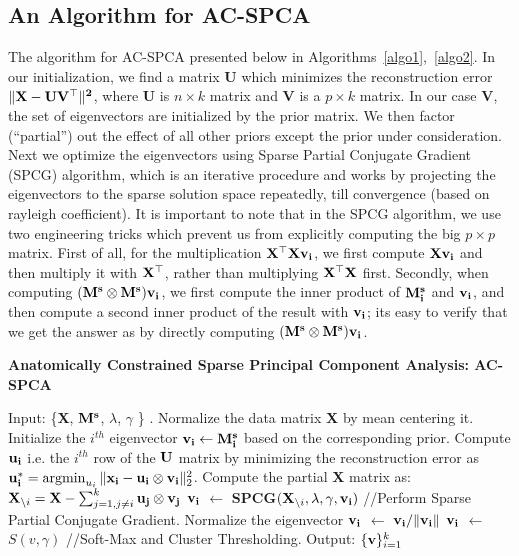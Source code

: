 \documentclass{llncs}
\newcommand{\argmin}{\operatornamewithlimits{argmin}}
\begin{document}

\subsection{An Algorithm for AC-SPCA}
The algorithm for AC-SPCA presented below in Algorithms~\ref{algo1},~\ref{algo2}. In our initialization, we find a matrix {\bf U} which minimizes the reconstruction error  $\bf \|X - UV^{\top}\|^2$, where {\bf U} is $n\times k$ matrix and {\bf V} is a {$p \times k$} matrix. In our case {\bf V}, the set of eigenvectors are initialized by the prior matrix. We then factor (``partial'') out the effect of all other priors except the prior under consideration. Next we optimize the eigenvectors using Sparse Partial Conjugate Gradient (SPCG) algorithm, which is an iterative procedure and works by projecting the eigenvectors to the sparse solution space repeatedly, till convergence (based on rayleigh coefficient). It is important to note that in the SPCG algorithm, we use two engineering tricks which prevent us from explicitly computing the big $p\times p$ matrix.  First of all, for the multiplication $\bf X^{\top}Xv_i$, we first compute $\bf Xv_i$ and then multiply it with $\bf X^{\top}$, rather than multiplying $\bf X^{\top}X$ first. Secondly, when computing $({\bf M^s\otimes M^s}){\bf v_i}$, we first compute the inner product of ${\bf M^s_i}$ and $\bf v_i$, and then compute a second inner product of the result with  $\bf v_i$; its easy to verify that we get the answer as by directly computing $({\bf M^s\otimes M^s}){\bf v_i}$.

\begin{algorithm}[htdp]
\small \caption{\bf Anatomically Constrained Sparse Principal Component Analysis: AC-SPCA}
\label{algo1}
\begin{algorithmic}[1]
\STATE Input:  \{{\bf X}, {$\bf M^s$}, $\lambda$, $\gamma$ \} .
\STATE Normalize the data matrix {\bf X} by  mean centering it.
\STATE Initialize the $i^{th}$ eigenvector $\bf v_{i} \gets M^s_i$ based on the corresponding prior.
\STATE Compute {$\bf u_i$} i.e. the $i^{th}$ row of the $\bf U$ matrix by minimizing the reconstruction error as ${\bf u_i^*}= \argmin_{u_i} \|{\bf x_i} - {\bf u_i}\otimes {\bf v_i} \|_2^2$.
\ENDFOR
{}
\STATE Compute the partial {\bf X} matrix as: ${\bf X}_{\backslash i}= {\bf X}- \sum_{j=1, j\neq i}^{k}  {\bf u_j}\otimes {\bf v_j}$
\STATE  ${\bf v_i}$ $\gets$ {\bf SPCG}$({\bf X}_{\backslash i},\lambda,\gamma, {\bf v_i})$ //Perform Sparse Partial Conjugate Gradient.
\STATE Normalize the eigenvector ${\bf v_i}$ $\gets$ ${\bf v_i}/\|{\bf v_i}\|$
\STATE ${\bf v_i}$ $\gets$  $S(v,\gamma)$ //Soft-Max and Cluster Thresholding.
\ENDFOR
\STATE Output:  $\{{\bf v}\}_{i=1}^{k}$
\end{algorithmic}
\end{algorithm}
\end{document}
